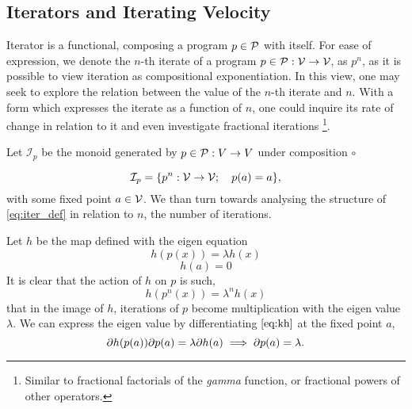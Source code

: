  \subsection{Iterators and Iterating Velocity}
 

  Iterator is a functional, composing a program $p\in\mathcal{P}$ with itself. For ease of expression, we denote the $n$-th iterate of a program $p\in\mathcal{P}:\mathcal{V}\to \mathcal{V}$, as $p^n$, as it is possible to view iteration as compositional exponentiation. In this view, one may seek to explore the relation between the value of the $n$-th iterate and $n$. With a form which expresses the iterate as a function of $n$, one could inquire its rate of change in relation to it and even investigate fractional iterations
\footnote{Similar to fractional factorials of the \emph{gamma} function, or fractional powers of other operators.}.
  
Let $\mathcal{I}_p$ be the monoid generated by $p\in\mathcal{P}:V\to V$ under composition $\circ$
  
  \begin{equation}\label{eq:iter_def}
  \mathcal{I}_p=\{p^n:\mathcal{V}\to \mathcal{V};\quad p(a)=a\},
  \end{equation}
 with some fixed point $a\in \mathcal{V}$. We than turn towards analysing the structure of \eqref{eq:iter_def} in relation to $n$, the number of iterations.

Let $h$ be the map defined with the eigen equation  
\begin{equation}\label{eq:kh}
  h(p(x))=\lambda h(x)
  \end{equation}
   \begin{equation}
   h(a)=0
   \end{equation}
It is clear that the action of $h$ on $p$ is such, 
  \begin{equation}
  h(p^n(x))=\lambda^nh(x)
  \end{equation}
that in the image of $h$, iterations of $p$ become multiplication with the eigen value $\lambda$. We can express the eigen value by differentiating $\eqref{eq:kh}$ at the fixed point $a$,
$$\partial h(p(a))\partial p(a)=\lambda\partial h(a)\implies\partial p(a)=\lambda.$$

